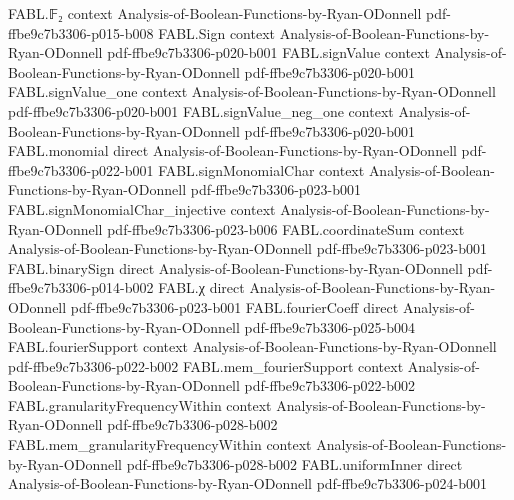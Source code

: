 \begin{theorem}
\label{FABL.weighted_mismatch_sub_smallBall_le}
\leanok
{}
\proofstep
  {FABL.𝔽₂}
  {context}
  {Analysis-of-Boolean-Functions-by-Ryan-ODonnell}
  {pdf-ffbe9c7b3306-p015-b008}
\proofstep
  {FABL.Sign}
  {context}
  {Analysis-of-Boolean-Functions-by-Ryan-ODonnell}
  {pdf-ffbe9c7b3306-p020-b001}
\proofstep
  {FABL.signValue}
  {context}
  {Analysis-of-Boolean-Functions-by-Ryan-ODonnell}
  {pdf-ffbe9c7b3306-p020-b001}
\proofstep
  {FABL.signValue_one}
  {context}
  {Analysis-of-Boolean-Functions-by-Ryan-ODonnell}
  {pdf-ffbe9c7b3306-p020-b001}
\proofstep
  {FABL.signValue_neg_one}
  {context}
  {Analysis-of-Boolean-Functions-by-Ryan-ODonnell}
  {pdf-ffbe9c7b3306-p020-b001}
\proofstep
  {FABL.monomial}
  {direct}
  {Analysis-of-Boolean-Functions-by-Ryan-ODonnell}
  {pdf-ffbe9c7b3306-p022-b001}
\proofstep
  {FABL.signMonomialChar}
  {context}
  {Analysis-of-Boolean-Functions-by-Ryan-ODonnell}
  {pdf-ffbe9c7b3306-p023-b001}
\proofstep
  {FABL.signMonomialChar_injective}
  {context}
  {Analysis-of-Boolean-Functions-by-Ryan-ODonnell}
  {pdf-ffbe9c7b3306-p023-b006}
\proofstep
  {FABL.coordinateSum}
  {context}
  {Analysis-of-Boolean-Functions-by-Ryan-ODonnell}
  {pdf-ffbe9c7b3306-p023-b001}
\proofstep
  {FABL.binarySign}
  {direct}
  {Analysis-of-Boolean-Functions-by-Ryan-ODonnell}
  {pdf-ffbe9c7b3306-p014-b002}
\proofstep
  {FABL.χ}
  {direct}
  {Analysis-of-Boolean-Functions-by-Ryan-ODonnell}
  {pdf-ffbe9c7b3306-p023-b001}
\proofstep
  {FABL.fourierCoeff}
  {direct}
  {Analysis-of-Boolean-Functions-by-Ryan-ODonnell}
  {pdf-ffbe9c7b3306-p025-b004}
\proofstep
  {FABL.fourierSupport}
  {context}
  {Analysis-of-Boolean-Functions-by-Ryan-ODonnell}
  {pdf-ffbe9c7b3306-p022-b002}
\proofstep
  {FABL.mem_fourierSupport}
  {context}
  {Analysis-of-Boolean-Functions-by-Ryan-ODonnell}
  {pdf-ffbe9c7b3306-p022-b002}
\proofstep
  {FABL.granularityFrequencyWithin}
  {context}
  {Analysis-of-Boolean-Functions-by-Ryan-ODonnell}
  {pdf-ffbe9c7b3306-p028-b002}
\proofstep
  {FABL.mem_granularityFrequencyWithin}
  {context}
  {Analysis-of-Boolean-Functions-by-Ryan-ODonnell}
  {pdf-ffbe9c7b3306-p028-b002}
\proofstep
  {FABL.uniformInner}
  {direct}
  {Analysis-of-Boolean-Functions-by-Ryan-ODonnell}
  {pdf-ffbe9c7b3306-p024-b001}

\end{theorem}
